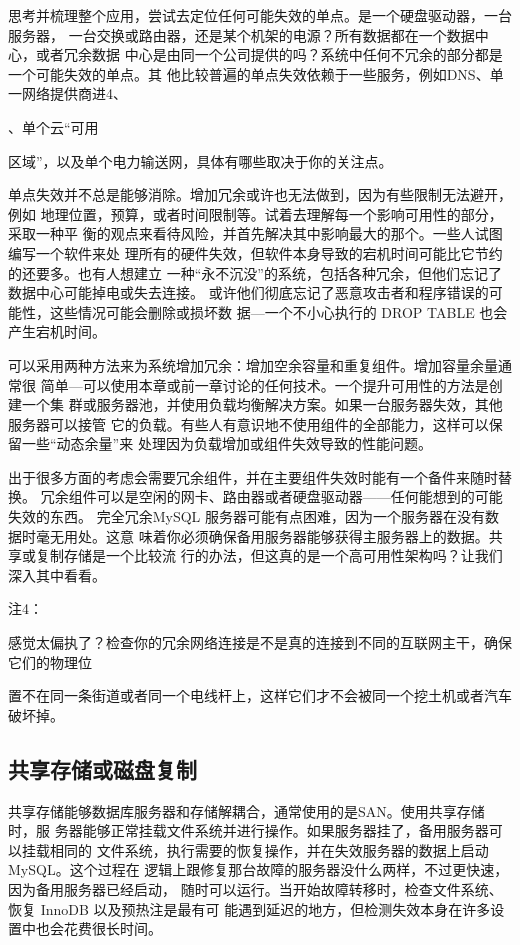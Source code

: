 思考并梳理整个应用，尝试去定位任何可能失效的单点。是一个硬盘驱动器，一台服务器，
一台交换或路由器，还是某个机架的电源？所有数据都在一个数据中心，或者冗余数据
中心是由同一个公司提供的吗？系统中任何不冗余的部分都是一个可能失效的单点。其
他比较普遍的单点失效依赖于一些服务，例如DNS、单一网络提供商进4、

、单个云“可用

区域”，以及单个电力输送网，具体有哪些取决于你的关注点。

单点失效并不总是能够消除。增加冗余或许也无法做到，因为有些限制无法避开，例如
地理位置，预算，或者时间限制等。试着去理解每一个影响可用性的部分，采取一种平
衡的观点来看待风险，并首先解决其中影响最大的那个。一些人试图编写一个软件来处
理所有的硬件失效，但软件本身导致的宕机时间可能比它节约的还要多。也有人想建立
一种“永不沉没”的系统，包括各种冗余，但他们忘记了数据中心可能掉电或失去连接。
或许他们彻底忘记了恶意攻击者和程序错误的可能性，这些情况可能会删除或损坏数
据—一个不小心执行的 DROP TABLE 也会产生宕机时间。

可以采用两种方法来为系统增加冗余：增加空余容量和重复组件。增加容量余量通常很
简单—可以使用本章或前一章讨论的任何技术。一个提升可用性的方法是创建一个集
群或服务器池，并使用负载均衡解决方案。如果一台服务器失效，其他服务器可以接管
它的负载。有些人有意识地不使用组件的全部能力，这样可以保留一些“动态余量”来
处理因为负载增加或组件失效导致的性能问题。

出于很多方面的考虑会需要冗余组件，并在主要组件失效时能有一个备件来随时替换。
冗余组件可以是空闲的网卡、路由器或者硬盘驱动器——任何能想到的可能失效的东西。
完全冗余MySQL 服务器可能有点困难，因为一个服务器在没有数据时毫无用处。这意
味着你必须确保备用服务器能够获得主服务器上的数据。共享或复制存储是一个比较流
行的办法，但这真的是一个高可用性架构吗？让我们深入其中看看。

注4：

感觉太偏执了？检查你的冗余网络连接是不是真的连接到不同的互联网主干，确保它们的物理位

置不在同一条街道或者同一个电线杆上，这样它们才不会被同一个挖土机或者汽车破坏掉。

\subsection{共享存储或磁盘复制}
共享存储能够数据库服务器和存储解耦合，通常使用的是SAN。使用共享存储时，服
务器能够正常挂载文件系统并进行操作。如果服务器挂了，备用服务器可以挂载相同的
文件系统，执行需要的恢复操作，并在失效服务器的数据上启动 MySQL。这个过程在
逻辑上跟修复那台故障的服务器没什么两样，不过更快速，因为备用服务器已经启动，
随时可以运行。当开始故障转移时，检查文件系统、恢复 InnoDB 以及预热注是最有可
能遇到延迟的地方，但检测失效本身在许多设置中也会花费很长时间。

